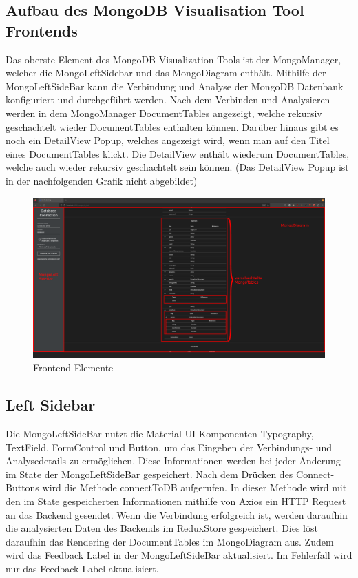 \subsection{Aufbau des MongoDB Visualisation Tool Frontends}
\label{sub:fe_aufbau}
Das oberste Element des MongoDB Visualization Tools ist der MongoManager, welcher die MongoLeftSidebar und das MongoDiagram enthält.
Mithilfe der MongoLeftSideBar kann die Verbindung und Analyse der MongoDB Datenbank konfiguriert und durchgeführt werden.
Nach dem Verbinden und Analysieren werden in dem MongoManager DocumentTables angezeigt, welche rekursiv geschachtelt wieder DocumentTables enthalten können.
Darüber hinaus gibt es noch ein DetailView Popup, welches angezeigt wird, wenn man auf den Titel eines DocumentTables klickt.
Die DetailView enthält wiederum DocumentTables, welche auch wieder rekursiv geschachtelt sein können.
(Das DetailView Popup ist in der nachfolgenden Grafik nicht abgebildet)

\begin{figure}[H]
    \includegraphics[width=\textwidth]{images/frontend_layers}
    \caption{Frontend Elemente}
    \label{fig:frontend_layers}
\end{figure}

\subsection{Left Sidebar}
\label{sub:fe_left_sidebar}

Die  MongoLeftSideBar nutzt die Material UI Komponenten Typography, TextField, FormControl und Button, um das Eingeben der Verbindungs- und Analysedetails zu ermöglichen.
Diese Informationen werden bei jeder Änderung im State der MongoLeftSideBar gespeichert.
Nach dem Drücken des Connect-Buttons wird die Methode connectToDB aufgerufen.
In dieser Methode wird mit den im State gespeicherten Informationen mithilfe von Axios ein HTTP Request an das Backend gesendet.
Wenn die Verbindung erfolgreich ist, werden daraufhin die analysierten Daten des Backends im ReduxStore gespeichert.
Dies löst daraufhin das Rendering der DocumentTables im MongoDiagram aus.
Zudem wird das Feedback Label in der MongoLeftSideBar aktualisiert.
Im Fehlerfall wird nur das Feedback Label aktualisiert.


